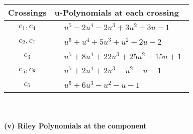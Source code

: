 \documentclass[1p]{elsarticle_modified}
\theoremstyle{definition}
\begin{document}
\begin{tabular}{m{50pt}|m{274pt}}
Crossings & \hspace{64pt}u-Polynomials at each crossing \\
\hline $$\begin{aligned}c_{1},c_{4}\end{aligned}$$&$\begin{aligned}
&u^5-2 u^4-2 u^3+3 u^2+3 u-1
\end{aligned}$\\
\hline $$\begin{aligned}c_{2},c_{7}\end{aligned}$$&$\begin{aligned}
&u^5+u^4+5 u^3+u^2+2 u-2
\end{aligned}$\\
\hline $$\begin{aligned}c_{3}\end{aligned}$$&$\begin{aligned}
&u^5+8 u^4+22 u^3+25 u^2+15 u+1
\end{aligned}$\\
\hline $$\begin{aligned}c_{5},c_{8}\end{aligned}$$&$\begin{aligned}
&u^5+2 u^4+2 u^3- u^2- u-1
\end{aligned}$\\
\hline $$\begin{aligned}c_{6}\end{aligned}$$&$\begin{aligned}
&u^5+6 u^3- u^2- u-1
\end{aligned}$\\
\hline
\end{tabular}\\~\\
\newpage\renewcommand{\arraystretch}{1}
\flushleft \textbf{(v) Riley Polynomials at the component}\newline \\
\end{document}

